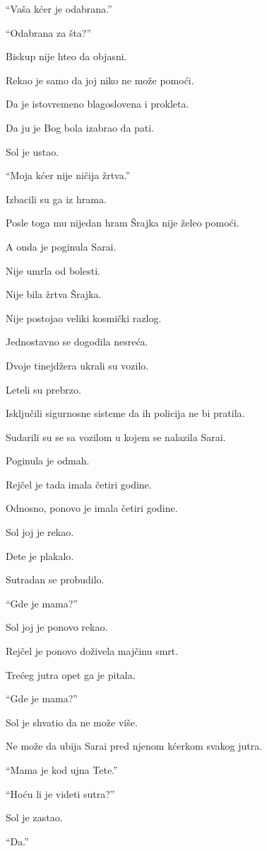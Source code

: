 ``Vaša kćer je odabrana.''

``Odabrana za šta?''

Biskup nije hteo da objasni.

Rekao je samo da joj niko ne može pomoći.

Da je istovremeno blagoslovena i prokleta.

Da ju je Bog bola izabrao da pati.

Sol je ustao.

``Moja kćer nije ničija žrtva.''

Izbacili su ga iz hrama.

Posle toga mu nijedan hram Šrajka nije želeo pomoći.

\bigskip

A onda je poginula Sarai.

Nije umrla od bolesti.

Nije bila žrtva Šrajka.

Nije postojao veliki kosmički razlog.

Jednostavno se dogodila nesreća.

Dvoje tinejdžera ukrali su vozilo.

Leteli su prebrzo.

Isključili sigurnosne sisteme da ih policija ne bi pratila.

Sudarili su se sa vozilom u kojem se nalazila Sarai.

Poginula je odmah.

Rejčel je tada imala četiri godine.

Odnosno, ponovo je imala četiri godine.

Sol joj je rekao.

Dete je plakalo.

Sutradan se probudilo.

``Gde je mama?''

Sol joj je ponovo rekao.

Rejčel je ponovo doživela majčinu smrt.

Trećeg jutra opet ga je pitala.

``Gde je mama?''

Sol je shvatio da ne može više.

Ne može da ubija Sarai pred njenom kćerkom svakog jutra.

``Mama je kod ujna Tete.''

``Hoću li je videti sutra?''

Sol je zastao.

``Da.''

